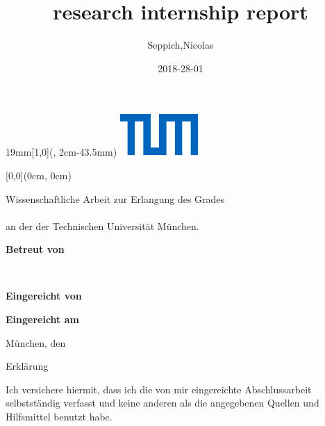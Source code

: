 \documentclass[11pt]{report} %
\title{research internship report}
\date{2018-28-01}
\author{Seppich,Nicolas}
\newcommand{\SeitenrandOben}{43.5mm}
\newcommand{\UniversitaetLogoBreite}{19mm}
\begin{document}
\begin{textblock*}{\UniversitaetLogoBreite}[1,0](\textwidth-1mm, 2cm-\SeitenrandOben)%
    \raggedleft\includegraphics{./Deckblatt/Ressourcen/Universitaet_Logo_RGB.pdf}%
\end{textblock*}


\begin{textblock*}{\textwidth}[0,0](0cm, 0cm)%
{\fontsize{24pt}{26pt}\selectfont\textbf{\Titel}}

\vspace*{14pt}
{\fontsize{18pt}{27pt}\selectfont\textbf{\Untertitel}}
\end{textblock*}

\vspace*{92.2mm}
\fontsize{15pt}{17.5pt}\selectfont%
Wissenschaftliche Arbeit zur Erlangung des Grades\\
\Grad\\
an der \Fakultaet{} der Technischen Universität München.

\renewcommand{\baselinestretch}{1.47}
\normalsize\selectfont
\vspace*{17.1mm}
\textbf{Betreut von}\tab
\begin{minipage}[t]{\textwidth-\CurrentLineWidth}
\BetreutVonPerson\\
\BetreutVonLehrstuhl\strut
\end{minipage}

\vspace*{4.3mm}
\textbf{Eingereicht von}\tab
\begin{minipage}[t]{\textwidth-\CurrentLineWidth}
\EingereichtVon
\end{minipage}

\vspace*{-1mm}
\textbf{Eingereicht am}\tab 
\begin{minipage}[t]{\textwidth-\CurrentLineWidth}
München, den \Datum\strut
\end{minipage}

\newpage

\vspace*{-15.8mm}
\fontsize{19pt}{21pt}\selectfont
\ErklaerungUeberschrift

\vspace{25.3mm}
Erklärung

\normalsize\selectfont
\vspace{13.2mm}
Ich versichere hiermit, dass ich die von mir eingereichte Abschlussarbeit selbstständig verfasst und keine anderen als die angegebenen Quellen und Hilfsmittel benutzt habe.
\end{document}
